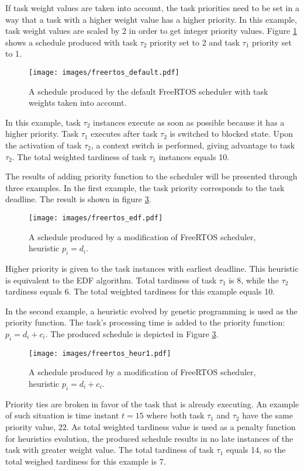 If task weight values are taken into account, the task priorities need to be set in a way that a task with a higher weight value has a higher priority.
In this example, task weight values are scaled by 2 in order to get integer priority values.
Figure \ref{freertos_def_2} shows a schedule produced with task $\tau_2$ priority set to 2 and task $\tau_1$ priority set to 1. 
\begin{figure}[ht]
    \centering
    \texttt{[image: images/freertos\_default.pdf]}
    \caption{A schedule produced by the default FreeRTOS scheduler with task weights taken into account.}
    \label{freertos_def_2}
\end{figure}
In this example, task $\tau_2$ instances execute as soon as possible because it has a higher priority.
Task $\tau_1$ executes after task $\tau_2$ is switched to blocked state.
Upon the activation of task $\tau_2$, a context switch is performed, giving advantage to task $\tau_2$.
The total weighted tardiness of task $\tau_1$ instances equals 10.

The results of adding priority function to the scheduler will be presented through three examples.
In the first example, the task priority corresponds to the task deadline.
The result is shown in figure \ref{freertos_1}. 
\begin{figure}[ht]
    \centering
    \texttt{[image: images/freertos\_edf.pdf]}
    \caption{A schedule produced by a modification of FreeRTOS scheduler, heuristic $p_i = d_i$.}
    \label{freertos_edf}
\end{figure}
Higher priority is given to the task instances with earliest deadline.
This heuristic is equivalent to the EDF algorithm.
Total tardiness of task $\tau_1$ is 8, while the $\tau_2$ tardiness equals 6.
The total weighted tardiness for this example equals 10.

In the second example, a heuristic evolved by genetic programming is used as the priority function.
The task's processing time is added to the priority function: $p_i = d_i + c_i$.
The produced schedule is depicted in Figure \ref{freertos_1}.
\begin{figure}[ht]
    \centering
    \texttt{[image: images/freertos\_heur1.pdf]}
    \caption{A schedule produced by a modification of FreeRTOS scheduler, heuristic $p_i = d_i + c_i$.}
    \label{freertos_1}
\end{figure}
Priority ties are broken in favor of the task that is already executing.
An example of such situation is time instant $t=15$ where both task $\tau_1$ and $\tau_2$ have the same priority value, $22$.
As total weighted tardiness value is used as a penalty function for heuristics evolution, the produced schedule results in no late instances of the task with greater weight value.
The total tardiness of task $\tau_1$ equals 14, so the total weighed tardiness for this example is 7.

